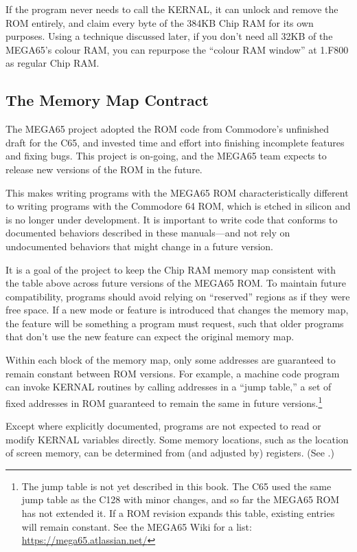 If the program never needs to call the KERNAL, it can unlock and remove the ROM entirely, and claim every byte of the 384KB Chip RAM for its own purposes. Using a technique discussed later, if you don't need all 32KB of the MEGA65's colour RAM, you can repurpose the ``colour RAM window'' at 1.F800 as regular Chip RAM.

\subsection{The Memory Map Contract}

The MEGA65 project adopted the ROM code from Commodore's unfinished draft for the C65, and invested time and effort into finishing incomplete features and fixing bugs. This project is on-going, and the MEGA65 team expects to release new versions of the ROM in the future.

This makes writing programs with the MEGA65 ROM characteristically different to writing programs with the Commodore 64 ROM, which is etched in silicon and is no longer under development. It is important to write code that conforms to documented behaviors described in these manuals---and not rely on undocumented behaviors that might change in a future version.

It is a goal of the project to keep the Chip RAM memory map consistent with the table above across future versions of the MEGA65 ROM. To maintain future compatibility, programs should avoid relying on ``reserved'' regions as if they were free space. If a new mode or feature is introduced that changes the memory map, the feature will be something a program must request, such that older programs that don't use the new feature can expect the original memory map.

Within each block of the memory map, only some addresses are guaranteed to remain constant between ROM versions. For example, a machine code program can invoke KERNAL routines by calling addresses in a ``jump table,'' a set of fixed addresses in ROM guaranteed to remain the same in future versions.\footnote{The jump table is not yet described in this book. The C65 used the same jump table as the C128 with minor changes, and so far the MEGA65 ROM has not extended it. If a ROM revision expands this table, existing entries will remain constant. See the MEGA65 Wiki for a list: \url{https://mega65.atlassian.net/}}

Except where explicitly documented, programs are not expected to read or modify KERNAL variables directly. Some memory locations, such as the location of screen memory, can be determined from (and adjusted by) registers. (See .)

